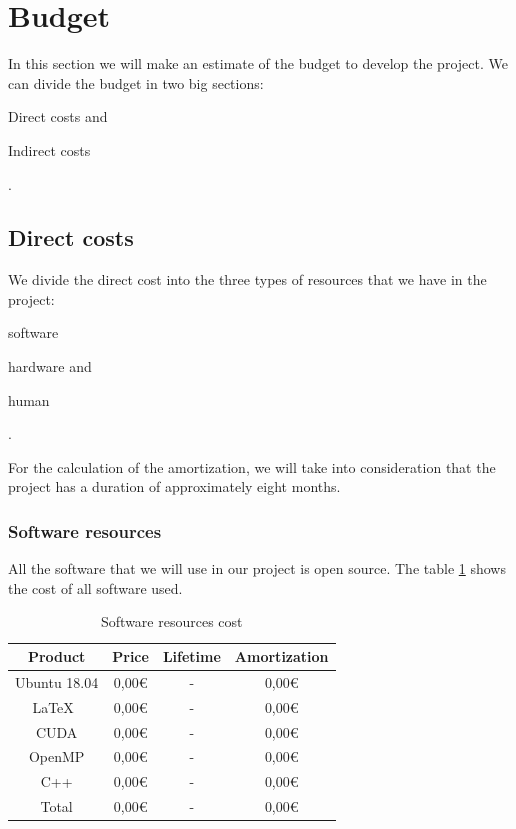\documentclass[titlepage,12pt]{report}
\begin{document}
\section{Budget}

In this section we will make an estimate of the budget to develop the project. We can divide the budget in two big sections: \begin{enumerate*}[label=\roman*)] \item Direct costs and \item Indirect costs \end{enumerate*}.

\subsection{Direct costs}

We divide the direct cost into the three types of resources that we have in the project: \begin{enumerate*}[label=\roman*)] \item software \item hardware and \item human \end{enumerate*}.

For the calculation of the amortization, we will take into consideration that the project has a duration of approximately eight months.

\subsubsection{Software resources}

All the software that we will use in our project is open source. The table \ref{soft} shows the cost of all software used.

\begin{table}[H]
	\centering
	\begin{tabular}{|c|c|c|c|}
		\hline
		\textbf{Product} & \textbf{Price} & \textbf{Lifetime} & \textbf{Amortization} \\ \hline \hline
		Ubuntu 18.04 	& 0,00€ & - & 0,00€ \\ \hline
		\LaTeX\ 		& 0,00€ & - & 0,00€ \\ \hline
		CUDA 			& 0,00€ & - & 0,00€ \\ \hline
		OpenMP 			& 0,00€ & - & 0,00€ \\ \hline
		C++ 			& 0,00€ & - & 0,00€ \\ \hline	\hline
		Total 			& 0,00€ & - & 0,00€ \\ \hline
	\end{tabular}
	\caption{Software resources cost}
	\label{soft}
\end{table}
\end{document}

